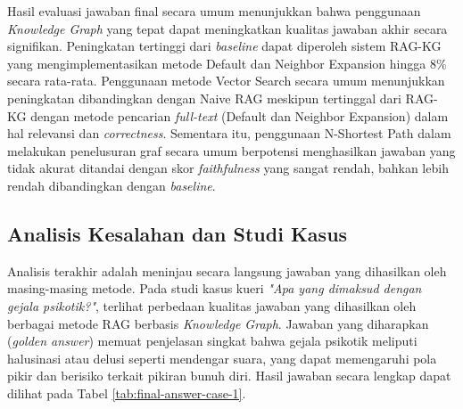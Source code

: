 Hasil evaluasi jawaban final secara umum menunjukkan bahwa penggunaan \textit{Knowledge Graph} yang tepat dapat meningkatkan kualitas jawaban akhir secara signifikan.
Peningkatan tertinggi dari \textit{baseline} dapat diperoleh sistem RAG-KG yang mengimplementasikan metode Default dan Neighbor Expansion hingga 8\% secara rata-rata.
Penggunaan metode Vector Search secara umum menunjukkan peningkatan dibandingkan dengan Naive RAG meskipun tertinggal dari RAG-KG dengan metode pencarian \textit{full-text} (Default dan Neighbor Expansion) dalam hal relevansi dan \textit{correctness}.
Sementara itu, penggunaan N-Shortest Path dalam melakukan penelusuran graf secara umum berpotensi menghasilkan jawaban yang tidak akurat ditandai dengan skor \textit{faithfulness} yang sangat rendah, bahkan lebih rendah dibandingkan dengan \textit{baseline}.

\subsection{Analisis Kesalahan dan Studi Kasus}

Analisis terakhir adalah meninjau secara langsung jawaban yang dihasilkan oleh masing-masing metode.
Pada studi kasus kueri \textit{"Apa yang dimaksud dengan gejala psikotik?"}, terlihat perbedaan kualitas jawaban yang dihasilkan oleh berbagai metode RAG berbasis \textit{Knowledge Graph}.
Jawaban yang diharapkan (\textit{golden answer}) memuat penjelasan singkat bahwa gejala psikotik meliputi halusinasi atau delusi seperti mendengar suara, yang dapat memengaruhi pola pikir dan berisiko terkait pikiran bunuh diri.
Hasil jawaban secara lengkap dapat dilihat pada Tabel \ref{tab:final-answer-case-1}.

